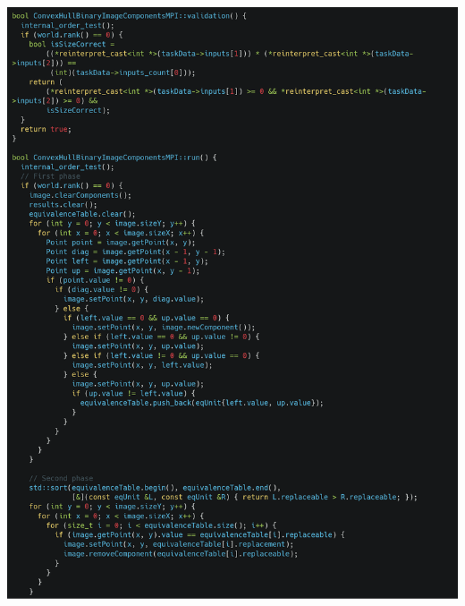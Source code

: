 \documentclass[a4paper]{article}
\begin{document}
\begin{center}
\includegraphics[width=481.95pt,height=632.1pt]{report-img006.png}
\end{center}
{
\ }
\end{document}
